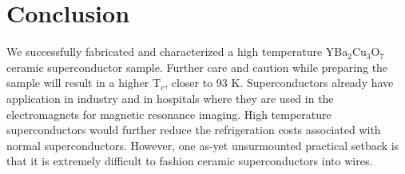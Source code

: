 \documentclass[aps,prl,twocolumn,groupedaddress]{revtex4}
\begin{document}
\section{Conclusion}
We successfully fabricated and characterized a high temperature YBa$_{2}$Cu$_{3}$O$_{7}$ ceramic superconductor sample. Further care and caution while preparing the sample will result in a higher T$_{c}$, closer to 93 K. Superconductors already have application in industry and in hospitals where they are used in the electromagnets for magnetic resonance imaging. High temperature superconductors would further reduce the refrigeration costs associated with normal superconductors. However, one as-yet unsurmounted practical setback is that it is extremely difficult to fashion ceramic superconductors into wires.\cite{sheahen}

%


\end{document}
